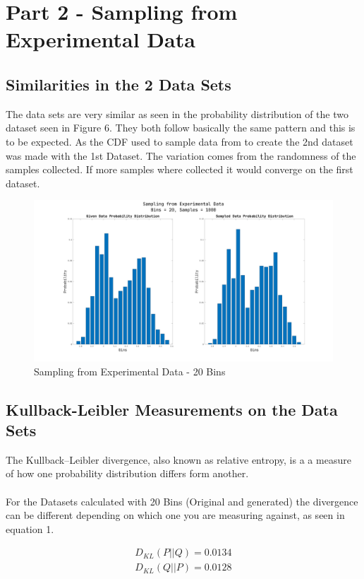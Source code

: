 \documentclass[a4paper]{article}
\begin{document}
\newpage

\section{Part 2 - Sampling from Experimental Data}
\subsection{Similarities in the 2 Data Sets}
The data sets are very similar as seen in the probability distribution of the two dataset seen in Figure 6. They both follow basically the same pattern and this is to be expected. As the CDF used to sample data from to create the 2nd dataset was made with the 1st Dataset. The variation comes from the randomness of the samples collected. If more samples where collected it would converge on the first dataset.

\begin{figure}[h!]
  \includegraphics[width=\textwidth]{part2/figure1}
  \caption{Sampling from Experimental Data - 20 Bins}
  \label{fig:rsp200}
\end{figure}


\subsection{Kullback-Leibler Measurements on the Data Sets}
The Kullback–Leibler divergence, also known as relative entropy, is a a measure of how one probability distribution differs form another. 
\\\\
For the Datasets calculated with 20 Bins (Original and generated) the divergence can be different depending on which one you are measuring against, as seen in equation 1.

\begin{equation}
\begin{aligned}
  D_{KL}(P || Q) = 0.0134\\
  D_{KL}(Q || P) = 0.0128
\end{aligned}
\end{equation}\break
  
\end{document}
